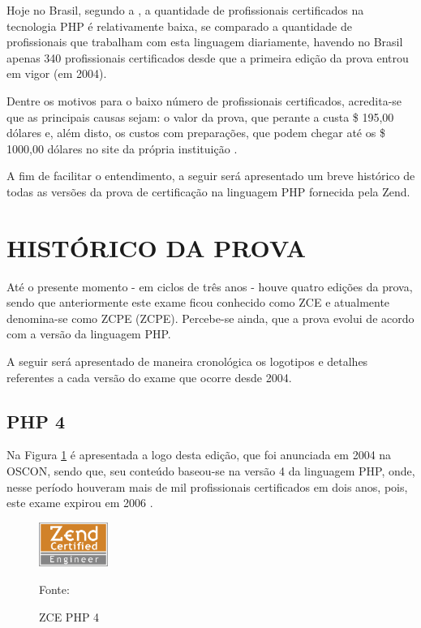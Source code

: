 Hoje no Brasil, segundo a , a
quantidade de profissionais certificados na tecnologia \acs{PHP} é relativamente
baixa, se comparado a quantidade de profissionais que trabalham com esta
linguagem diariamente, havendo no Brasil apenas 340 profissionais certificados
desde que a primeira edição da prova entrou em vigor (em 2004).

Dentre os motivos para o baixo número de profissionais certificados, acredita-se
que as principais causas sejam: o valor da prova, que perante a
 custa \$ 195,00 dólares e, além disto,
os custos com preparações, que podem chegar até os \$ 1000,00 dólares no site da
própria instituição \cite{websiteZendOnlineTraining}.

A fim de facilitar o entendimento, a seguir será apresentado um breve histórico
de todas as versões da prova de certificação na linguagem \acs{PHP} fornecida
pela \acs{Zend}.

\section{HISTÓRICO DA PROVA}

Até o presente momento - em ciclos de três anos - houve quatro edições da
prova, sendo que anteriormente este exame ficou conhecido como \ac{ZCE} e
atualmente denomina-se como \acl{ZCPE} (\acs{ZCPE}). Percebe-se ainda, que a
prova evolui de acordo com a versão da linguagem \acs{PHP}.

A seguir será apresentado de maneira cronológica os logotipos e detalhes
referentes a cada versão do exame que ocorre desde 2004.

\subsection{PHP 4}

Na Figura \ref{fig:logoCertificationPHP4} é apresentada a logo desta edição, que
foi anunciada em 2004 na \ac{OSCON}, sendo que, seu conteúdo baseou-se na versão
4 da linguagem \acs{PHP}, onde, nesse período houveram mais de mil profissionais
certificados em dois anos, pois, este exame expirou em 2006
\cite{entrevistaAriZCEBrasil}.

\begin{figure}[h!tb]
	\caption{ZCE PHP 4}
	\label{fig:logoCertificationPHP4}

	\centering
	\includegraphics[width=0.2\textwidth]{images/logo/php4.png}

	\centering
	\footnotesize Fonte: 
\end{figure}


